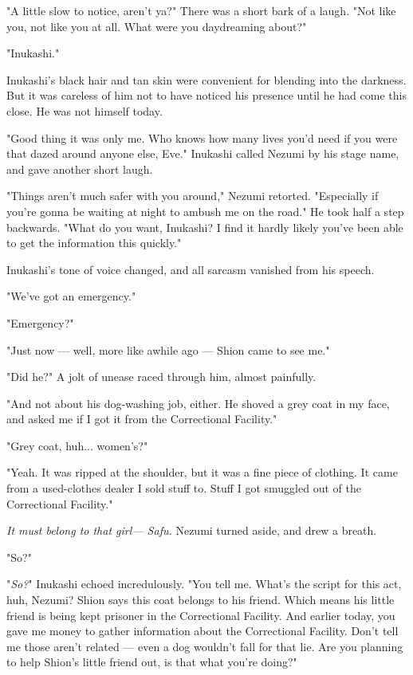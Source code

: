 "A little slow to notice, aren't ya?" There was a short bark of a laugh.
"Not like you, not like you at all. What were you daydreaming about?"

"Inukashi."

Inukashi's black hair and tan skin were convenient for blending into the
darkness. But it was careless of him not to have noticed his presence
until he had come this close. He was not himself today.

"Good thing it was only me. Who knows how many lives you'd need if you
were that dazed around anyone else, Eve." Inukashi called Nezumi by his
stage name, and gave another short laugh.

"Things aren't much safer with you around," Nezumi retorted. "Especially
if you're gonna be waiting at night to ambush me on the road." He took
half a step backwards. "What do you want, Inukashi? I find it hardly
likely you've been able to get the information this quickly."

Inukashi's tone of voice changed, and all sarcasm vanished from his
speech.

"We've got an emergency."

"Emergency?"

"Just now --- well, more like awhile ago --- Shion came to see me."

"Did he?" A jolt of unease raced through him, almost painfully.

"And not about his dog-washing job, either. He shoved a grey coat in my
face, and asked me if I got it from the Correctional Facility."

"Grey coat, huh... women's?"

"Yeah. It was ripped at the shoulder, but it was a fine piece of
clothing. It came from a used-clothes dealer I sold stuff to. Stuff I
got smuggled out of the Correctional Facility."

\emph{It must belong to that girl--- Safu.} Nezumi turned aside, and drew a
breath.

"So?"

"\emph{So?}" Inukashi echoed incredulously. "You tell me. What's the script for
this act, huh, Nezumi? Shion says this coat belongs to his friend. Which
means his little friend is being kept prisoner in the Correctional
Facility. And earlier today, you gave me money to gather information
about the Correctional Facility. Don't tell me those aren't related ---
even a dog wouldn't fall for that lie. Are you planning to help Shion's
little friend out, is that what you're doing?"

